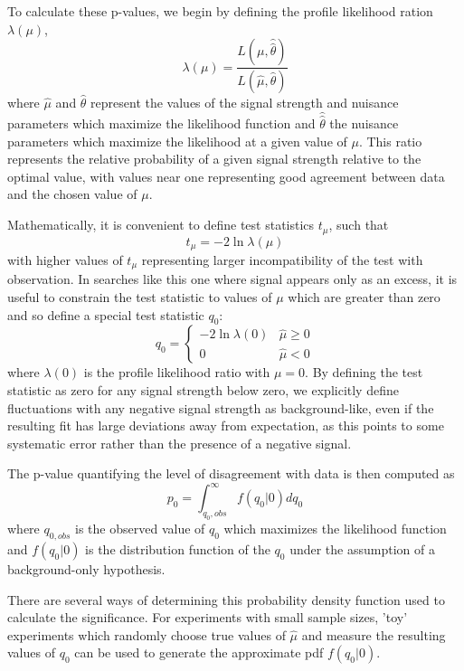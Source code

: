 To calculate these p-values, we begin by defining the profile likelihood ration $\lambda(\mu)$, 
\begin{equation}
   \lambda (\mu) = \frac{L(\mu, \hat{\hat{\theta}})}{L(\hat{\mu},\hat{\theta})}
\end{equation}
where $\hat{\mu}$ and $\hat{\theta}$ represent the values of the signal strength and nuisance parameters which maximize the likelihood function and $\hat{\hat{\theta}}$ the nuisance parameters which maximize the likelihood at a given value of $\mu$. 
This ratio represents the relative probability of a given signal strength relative to the optimal value, with values near one representing good agreement between data and the chosen value of $\mu$. 

Mathematically, it is convenient to define test statistics $t_\mu$, such that 
\begin{equation}
    t_\mu = -2 \ln \lambda (\mu)
\end{equation}
with higher values of $t_\mu$ representing larger incompatibility of the test with observation. 
In searches like this one where signal appears only as an excess, it is useful to constrain the test statistic to values of $\mu$ which are greater than zero and so define a special test statistic $q_0$:
\begin{equation}
    q_0 = 
	\begin{cases} 
		-2 \ln \lambda(0) & \hat{\mu} \geq 0\\
                 0                & \hat{\mu} < 0 
        \end{cases}
\end{equation}
where $\lambda(0)$ is the profile likelihood ratio with $\mu=$0. 
By defining the test statistic as zero for any signal strength below zero, we explicitly define fluctuations with any negative signal strength as background-like, even if the resulting fit has large deviations away from expectation, as this points to some systematic error rather than the presence of a negative signal.

The p-value quantifying the level of disagreement with data is then computed as
\begin{equation}
	p_0 = \int_{q_0,obs}^{\infty} f(q_0|0) dq_0
\end{equation}
where $q_{0,obs}$ is the observed value of $q_0$ which maximizes the likelihood function and $f(q_0|0)$ is the distribution function of the $q_0$ under the assumption of a background-only hypothesis.

There are several ways of determining this probability density function used to calculate the significance.
For experiments with small sample sizes, 'toy' experiments which randomly choose true values of $\hat{\mu}$ and measure the resulting values of $q_0$ can be used to generate the approximate pdf $f(q_0|0)$. 

